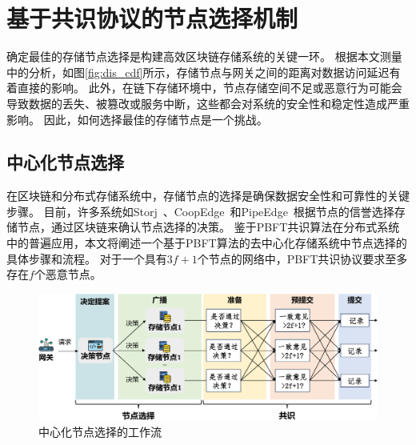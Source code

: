 \cleardoublepage
\chapter{基于共识协议的节点选择机制}
\label{sec:consensus}
确定最佳的存储节点选择是构建高效区块链存储系统的关键一环。
根据本文测量中的分析，如图\autoref{fig:dis_cdf}所示，存储节点与网关之间的距离对数据访问延迟有着直接的影响。
此外，在链下存储环境中，节点存储空间不足或恶意行为可能会导致数据的丢失、被篡改或服务中断，这些都会对系统的安全性和稳定性造成严重影响。
因此，如何选择最佳的存储节点是一个挑战。

\section{中心化节点选择}
在区块链和分布式存储系统中，存储节点的选择是确保数据安全性和可靠性的关键步骤。
目前，许多系统如Storj~\cite{storj2018storj}、CoopEdge~\cite{yuan2021coopedge}和PipeEdge~\cite{yuan2023pipeedge}根据节点的信誉选择存储节点，通过区块链来确认节点选择的决策。
鉴于PBFT共识算法在分布式系统中的普遍应用，本文将阐述一个基于PBFT算法的去中心化存储系统中节点选择的具体步骤和流程。
对于一个具有$3f+1$个节点的网络中，PBFT共识协议要求至多存在$f$个恶意节点。

\begin{figure}[t]
    \centering
    \includegraphics[width=1\linewidth]{figures/timechain/pbft.pdf}
    \caption{中心化节点选择的工作流}
    \label{fig:pbft}
\end{figure}

